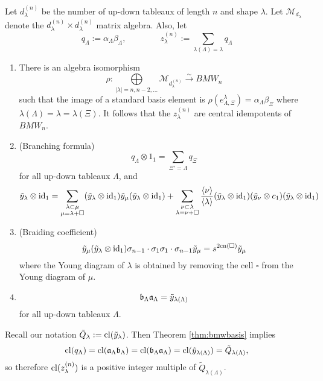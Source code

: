 \begin{theorem}[\AP{BB01}, Section 5] \label{thm:bmwbasis}
Let $d_\lambda^{(n)}$ be the number of up-down tableaux of length $n$ and shape $\lambda$. 
Let $\mathcal{M}_{d_\lambda}$ denote the $d_\lambda^{(n)} \times d_\lambda^{(n)}$ matrix algebra. 
Also, let
\[
    q_\Lambda := \alpha_\Lambda \beta_\Lambda, \qquad \qquad z_\lambda^{(n)}:= \sum_{\lambda(\Lambda)=\lambda} q_\Lambda
\]

\begin{enumerate} 
\item There is an algebra isomorphism
\[
    \rho: \underset{|\lambda| = n, n-2, \dots}{\bigoplus} \mathcal{M}_{d_{\lambda}^{(n)}} \overset{\sim}{\longrightarrow} BMW_n
\]
such that the image of a standard basis element is $\rho( e_{\Lambda,\Xi}^\lambda) = \alpha_\Lambda \beta_\Xi$ where $\lambda(\Lambda) = \lambda = \lambda(\Xi)$.
It follows that the $z_\lambda^{(n)}$ are central idempotents of $BMW_n$. \\
\item (Branching formula)
\[
    q_\Lambda \otimes 1_1 = \sum_{\Xi'=\Lambda} q_\Xi
\] 
for all up-down tableaux $\Lambda$, and
\[
\tilde{y}_\lambda \otimes {\rm{id}}_1 = \sum_{\substack{\lambda \subset \mu \\ \mu = \lambda + \square}} (\tilde{y}_\lambda \otimes {\rm{id}}_1) \tilde{y}_\mu (\tilde{y}_\lambda \otimes {\rm{id}}_1) + \sum_{\substack{\nu \subset \lambda \\ \lambda = \nu + \square}} \frac{\langle \nu \rangle}{\langle \lambda \rangle} (\tilde{y}_\lambda \otimes {\rm{id}}_1) (\tilde{y}_\nu \otimes c_1) (\tilde{y}_\lambda \otimes {\rm{id}}_1) 
\]
\item (Braiding coefficient)
\[
\tilde{y}_\mu (\tilde{y}_\lambda \otimes {\rm{id}}_1) \sigma_{n-1} \cdot \sigma_1 \sigma_1 \cdot \sigma_{n-1} \tilde{y}_\mu = s^{2\mathrm{cn}(\square)}\tilde{y}_\mu
\]
where the Young diagram of $\lambda$ is obtained by removing the cell $\square$ from the Young diagram of $\mu$.  
\item 
\[
    \mathfrak{b}_\Lambda \mathfrak{a}_\Lambda = \tilde{y}_{\lambda(\Lambda)}
\]
for all up-down tableaux $\Lambda$.
\end{enumerate}
\end{theorem}

\begin{remark} \label{rmk:qclosure}
Recall our notation $\tilde{Q}_\lambda := \mathrm{cl}(\tilde{y}_\lambda)$. Then Theorem \ref{thm:bmwbasis} implies
\[
    \mathrm{cl}(q_\Lambda) = \mathrm{cl}(\mathfrak{a}_\Lambda \mathfrak{b}_\Lambda) = \mathrm{cl}(\mathfrak{b}_\Lambda \mathfrak{a}_\Lambda) = \mathrm{cl}(\tilde{y}_{\lambda(\Lambda)}) = \tilde{Q}_{\lambda(\Lambda)},
\]
so therefore $\mathrm{cl}(z_\lambda^{(n)})$ is a positive integer multiple of $\tilde{Q}_{\lambda(\Lambda)}$.
\end{remark}


